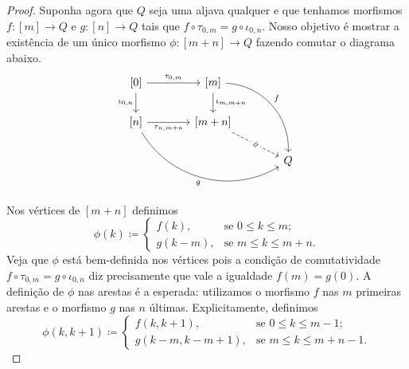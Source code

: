 \begin{proof}
    Suponha agora que $Q$ seja uma aljava qualquer e que tenhamos morfismos $f: [m] \to Q$ e $g: [n] \to Q$ tais que $f \circ \tau_{0,m} = g \circ \iota_{0,n}$.
    Nosso objetivo é mostrar a existência de um único morfismo $\phi: [m+n] \to Q$ fazendo comutar o diagrama abaixo.
    \begin{displaymath}
        \begin{tikzcd}[column sep=1.35cm]
            {[0]}
            \arrow[r,"{\tau_{0,m}}"]
            \arrow[d, "{\iota_{0,n}}" swap]
            & {[m]}
            \arrow[d, "{\iota_{m,m+n}}"]
            \arrow[rdd, bend left=45, "f"]
            \\ {[n]}
            \arrow[r, "{\tau_{n,m+n}}" swap]
            \arrow[rrd, bend right=45, "g" swap]
            & {[m+n]}
            \arrow[rd, dashed, "\phi" description]
            \\ & & Q
        \end{tikzcd}
    \end{displaymath}
    Nos vértices de $[m+n]$ definimos
    \begin{displaymath}
        \phi(k) \coloneqq
        \begin{cases}
            f(k), & \text{se } 0 \leq k \leq m; \\
            g(k-m), & \text{se } m \leq k \leq m+n.
        \end{cases}
    \end{displaymath}
    Veja que $\phi$ está bem-definida nos vértices pois a condição de comutatividade $f \circ \tau_{0,m} = g \circ \iota_{0,n}$ diz precisamente que vale a igualdade $f(m) = g(0)$.
    A definição de $\phi$ nas arestas é a esperada: utilizamos o morfismo $f$ nas $m$ primeiras arestas e o morfismo $g$ nas $n$ últimas.
    Explicitamente, definimos
    \begin{displaymath}
        \phi(k,k+1) \coloneqq
        \begin{cases}
            f(k,k+1), & \text{se } 0 \leq k \leq m-1; \\
            g(k-m,k-m+1), & \text{se } m \leq k \leq m+n-1.
        \end{cases}
    \end{displaymath}
    

\end{proof}
